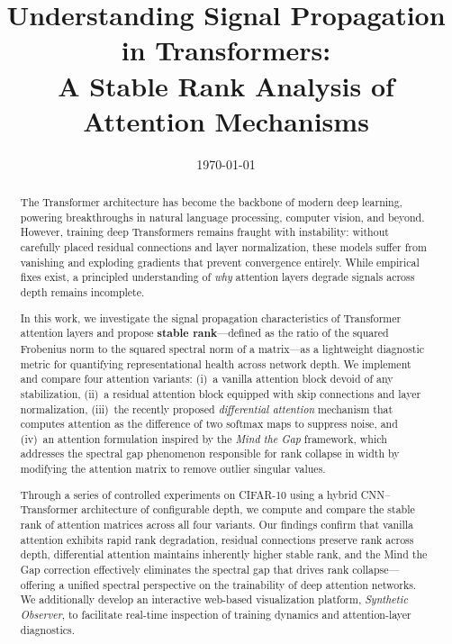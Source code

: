 \documentclass[12pt, a4paper]{article}
\title{
    \vspace{-1cm}
    \textbf{Understanding Signal Propagation in Transformers:\\
    A Stable Rank Analysis of Attention Mechanisms}
}
\author{
}
\date{\today}
\begin{document}
\maketitle
\thispagestyle{empty}

\begin{abstract}
\noindent
The Transformer architecture has become the backbone of modern deep learning,
powering breakthroughs in natural language processing, computer vision, and
beyond. However, training deep Transformers remains fraught with instability:
without carefully placed residual connections and layer normalization, these
models suffer from vanishing and exploding gradients that prevent convergence
entirely. While empirical fixes exist, a principled understanding of
\textit{why} attention layers degrade signals across depth remains incomplete.

In this work, we investigate the signal propagation characteristics of
Transformer attention layers and propose \textbf{stable rank}---defined as the
ratio of the squared Frobenius norm to the squared spectral norm of a
matrix---as a lightweight diagnostic metric for quantifying representational
health across network depth. We implement and compare four attention
variants: (i)~a vanilla attention block devoid of any stabilization,
(ii)~a residual attention block equipped with skip connections and layer
normalization, (iii)~the recently proposed \textit{differential attention}
mechanism that computes attention as the difference of two softmax maps to
suppress noise, and (iv)~an attention formulation inspired by the
\textit{Mind the Gap} framework, which addresses the spectral gap phenomenon
responsible for rank collapse in width by modifying the attention matrix to
remove outlier singular values.

Through a series of controlled experiments on CIFAR-10 using a hybrid
CNN--Transformer architecture of configurable depth, we compute and compare
the stable rank of attention matrices across all four variants. Our findings
confirm that vanilla attention exhibits rapid rank degradation, residual
connections preserve rank across depth, differential attention maintains
inherently higher stable rank, and the Mind the Gap correction effectively
eliminates the spectral gap that drives rank collapse---offering a unified
spectral perspective on the trainability of deep attention networks. We
additionally develop an interactive web-based visualization platform,
\textit{Synthetic Observer}, to facilitate real-time inspection of training
dynamics and attention-layer diagnostics.
\end{abstract}
\end{document}
